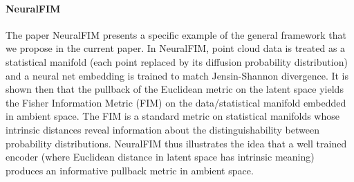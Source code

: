 \documentclass{article}
\theoremstyle{plain}
\theoremstyle{definition}
\theoremstyle{remark}
\newcommand{\xin}[1]{\textcolor{teal}{[XS: #1]}}
\newcommand{\danqi}[1]{\textcolor{cyan}{[Danqi: #1]}}
\newcommand{\ian}[1]{\textcolor{green}{[Ian: #1]}}
\begin{document}

\paragraph{NeuralFIM}

The paper NeuralFIM presents a specific example of the general framework that we propose in the current paper. In NeuralFIM, point cloud data is treated as a statistical manifold (each point replaced by its diffusion probability distribution) and a neural net embedding is trained to match Jensin-Shannon divergence. It is shown then that the pullback of the Euclidean metric on the latent space yields the Fisher Information Metric (FIM) on the data/statistical manifold embedded in ambient space. The FIM is a standard metric on statistical manifolds whose intrinsic distances reveal information about the distinguishability between probability distributions. NeuralFIM thus illustrates the idea that a well trained encoder (where Euclidean distance in latent space has intrinsic meaning) produces an informative pullback metric in ambient space. 
\end{document}
